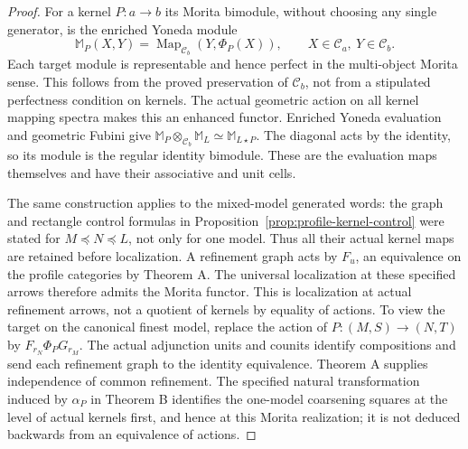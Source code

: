 \documentclass[11pt]{article}
\theoremstyle{definition}
\theoremstyle{remark}
\begin{document}
\begin{proof}
For a kernel $P:a\to b$ its Morita bimodule, without choosing any
single generator, is the enriched Yoneda module
\[
 \mathbb M_P(X,Y)=\operatorname{Map}_{\mathcal C_b}(Y,\Phi_P(X)),
 \qquad X\in\mathcal C_a,\ Y\in\mathcal C_b.
\]
Each target module is representable and hence perfect in the
multi-object Morita sense.  This follows from the proved preservation
of $\mathcal C_b$, not from a stipulated perfectness condition on
kernels.  The actual geometric action on all kernel mapping spectra
makes this an enhanced functor.  Enriched Yoneda evaluation and
geometric Fubini give
$\mathbb M_P\otimes_{\mathcal C_b}\mathbb M_L\simeq
\mathbb M_{L\star P}$.  The diagonal acts by the identity, so its
module is the regular identity bimodule.  These are the evaluation
maps themselves and have their associative and unit cells.

The same construction applies to the mixed-model generated words:
the graph and rectangle control formulas in
Proposition~\ref{prop:profile-kernel-control} were stated for
$M\preceq N\preceq L$, not only for one model.  Thus all their
actual kernel maps are retained before localization.  A refinement
graph acts by $F_u$, an equivalence on the profile categories by
Theorem A.  The universal localization at these specified arrows
therefore admits the Morita functor.  This is localization at actual
refinement arrows, not a quotient of kernels by equality of actions.
To view the target on the canonical finest model, replace the action
of $P:(M,S)\to(N,T)$ by $F_{r_N}\Phi_PG_{r_M}$.
The actual adjunction units and counits identify compositions and
send each refinement graph to the identity equivalence.  Theorem A
supplies independence of common refinement.  The specified natural
transformation induced by $\alpha_P$ in Theorem B identifies the
one-model coarsening squares at the level of actual kernels first,
and hence at this Morita realization; it is not deduced backwards
from an equivalence of actions.


\end{proof}
\end{document}
